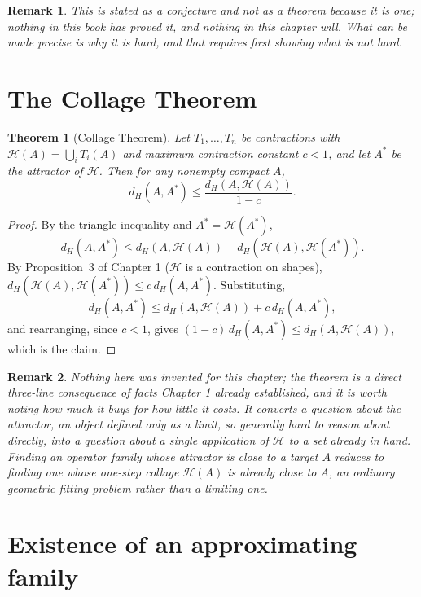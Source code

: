 \documentclass[11pt]{report}
\newtheorem{theorem}{Theorem}[chapter]
\newtheorem{remark}{Remark}[chapter]
\begin{document}
\begin{remark}
This is stated as a conjecture and not as a theorem because it is
one; nothing in this book has proved it, and nothing in this chapter
will. What can be made precise is why it is hard, and that requires
first showing what is \emph{not} hard.
\end{remark}

\section*{The Collage Theorem}

\begin{theorem}[Collage Theorem]
\label{thm:collage}
Let $T_1, \dots, T_n$ be contractions with $\mathcal{H}(A) =
\bigcup_i T_i(A)$ and maximum contraction constant $c < 1$, and let
$A^\ast$ be the attractor of $\mathcal{H}$. Then for any nonempty
compact $A$,
\[
d_H(A, A^\ast) \leq \frac{d_H(A, \mathcal{H}(A))}{1-c}.
\]
\end{theorem}
\begin{proof}
By the triangle inequality and $A^\ast = \mathcal{H}(A^\ast)$,
\[
d_H(A, A^\ast) \leq d_H(A, \mathcal{H}(A)) + d_H(\mathcal{H}(A), \mathcal{H}(A^\ast)).
\]
By Proposition~3 of Chapter 1 ($\mathcal{H}$ is a contraction on
shapes), $d_H(\mathcal{H}(A), \mathcal{H}(A^\ast)) \leq c\, d_H(A,
A^\ast)$. Substituting,
\[
d_H(A, A^\ast) \leq d_H(A, \mathcal{H}(A)) + c\, d_H(A, A^\ast),
\]
and rearranging, since $c < 1$, gives
$(1-c)\, d_H(A,A^\ast) \leq d_H(A, \mathcal{H}(A))$, which is the
claim.
\end{proof}

\begin{remark}
Nothing here was invented for this chapter; the theorem is a direct
three-line consequence of facts Chapter 1 already established, and it
is worth noting how much it buys for how little it costs. It converts
a question about the attractor, an object defined only as a limit, so
generally hard to reason about directly, into a question about a
single application of $\mathcal{H}$ to a set already in hand. Finding
an operator family whose attractor is close to a target $A$ reduces to
finding one whose \emph{one-step collage} $\mathcal{H}(A)$ is already
close to $A$, an ordinary geometric fitting problem rather than a
limiting one.
\end{remark}

\section*{Existence of an approximating family}
\end{document}

